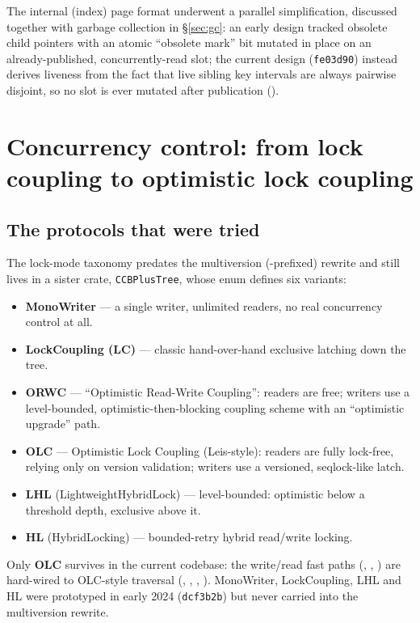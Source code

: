 \documentclass[11pt]{article}
\newcommand{\commit}[1]{\texttt{#1}}
\begin{document}
The internal (index) page format underwent a parallel simplification, discussed together
with garbage collection in \S\ref{sec:gc}: an early design tracked obsolete child
pointers with an atomic ``obsolete mark'' bit mutated in place on an already-published,
concurrently-read slot; the current design (\commit{fe03d90}) instead derives liveness
from the fact that live sibling key intervals are always pairwise disjoint, so no slot is
ever mutated after publication ().

\section{Concurrency control: from lock coupling to optimistic lock coupling}
\label{sec:cc}

\subsection{The protocols that were tried}

The lock-mode taxonomy predates the multiversion (-prefixed) rewrite and still
lives in a sister crate, \texttt{CCBPlusTree}, whose  enum defines
six variants:

\begin{itemize}
  \item \textbf{MonoWriter} --- a single writer, unlimited readers, no real concurrency
        control at all.
  \item \textbf{LockCoupling (LC)} --- classic hand-over-hand exclusive latching down the
        tree.
  \item \textbf{ORWC} --- ``Optimistic Read-Write Coupling'': readers are free; writers
        use a level-bounded, optimistic-then-blocking coupling scheme with an
        ``optimistic upgrade'' path.
  \item \textbf{OLC} --- Optimistic Lock Coupling (Leis-style): readers are fully
        lock-free, relying only on version validation; writers use a versioned,
        seqlock-like latch.
  \item \textbf{LHL} (LightweightHybridLock) --- level-bounded: optimistic below a
        threshold depth, exclusive above it.
  \item \textbf{HL} (HybridLocking) --- bounded-retry hybrid read/write locking.
\end{itemize}

Only \textbf{OLC} survives in the current codebase: the write/read fast paths
(, ,
) are hard-wired to OLC-style traversal
(, , ,
). MonoWriter, LockCoupling, LHL and HL were prototyped in
early 2024 (\commit{dcf3b2b}) but never carried into the multiversion rewrite.
\end{document}
